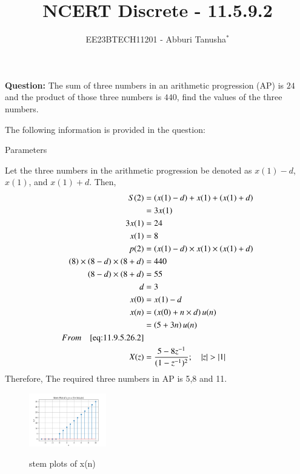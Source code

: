 \documentclass[journal,12pt,twocolumn]{IEEEtran}
\theoremstyle{remark}
\begin{document}

\vspace{3cm}

\title{NCERT Discrete - 11.5.9.2}
\author{EE23BTECH11201 - Abburi Tanusha$^{*}$%
}
\maketitle
\newpage
\bigskip

\renewcommand{\thefigure}{\theenumi}
\renewcommand{\thetable}{\theenumi}

\vspace{3cm}

\maketitle
\textbf{Question:} 
The sum of three numbers in an arithmetic progression (AP) is $24$ and the product of those three numbers is $440$, find the values of the three numbers.

\solution
The following information is provided in the question:
\begin{table}[h]
 	\centering
 	\resizebox{6 cm}{!}{
 		
 	}
 	\vspace{6 pt}
 	\caption{Parameters}
 	\label{tab:my_label} 
 \end{table}
\newline
Let the three numbers in the arithmetic progression be denoted as $x(1) - d$, $x(1)$, and $x(1) + d$. Then,
\begin{align}
  S(2) &= \left(x(1)-d\right) + x(1) + \left(x(1) +d\right) \\
       &= 3x(1) \\
     3x(1) &= 24 \\
    x(1) &= 8 \\
    \label{eq:eq3} 
   p(2) &= \left(x(1) - d\right) \times x(1) \times \left(x(1) + d\right)  \\
    \left(8\right) \times \left(8-d\right) \times \left(8+d\right) &= 440 \\
    \left(8-d\right) \times \left(8+d\right) &= 55 \\
    d &= 3 \\
    x(0) &= x(1)-d\\
    x(n) &= \left(x(0) + n \times d\right) u(n) \\
         &= \left(5 + 3n\right)u(n)\\
         From \quad \eqref{eq:11.9.5.26.2} \\
    X(z) &= \frac{5 - 8z^{-1}}{(1-z^{-1})^2} ; \quad \left\vert z\right\vert>\left\vert1\right\vert
\end{align}
Therefore, The required three numbers in AP is 5,8 and 11.
\begin{figure}[h!]
  \centering
  \includegraphics[width=0.3\textwidth]{figs/stem_plot.png} 
  \label{fig:1}
  \caption{stem plots of x(n)}
\end{figure}
\end{document}
